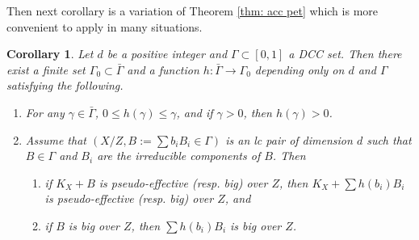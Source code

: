 \documentclass[11pt]{amsart}
\numberwithin{equation}{section}
\newcommand{\Ii}{{\Gamma}}
\newtheorem{cor}[thm]{Corollary}
\theoremstyle{definition}
\theoremstyle{definition}
\begin{document}
Then next corollary is a variation of Theorem \ref{thm: acc pet} which is more convenient to apply in many situations.
\begin{cor}\label{cor: gap of psd thresholds}
Let $d$ be a positive integer and $\Ii\subset [0,1]$ a DCC set. Then there exist a finite set $\Ii_0\subset\bar\Ii$ and a function $h: \bar\Ii\rightarrow\Ii_0$ depending only on $d$ and $\Ii$ satisfying the following. 
\begin{enumerate}
    \item For any $\gamma\in\bar\Ii$, $0\leq h(\gamma)\leq\gamma$, and if $\gamma>0$, then $h(\gamma)>0$. 
    \item Assume that $(X/Z,B:=\sum b_iB_i\in\Ii)$ is an lc pair of dimension $d$ such that $B\in\Ii$ and $B_i$ are the irreducible components of $B$. Then 
\begin{enumerate}
  \item if $K_X+B$ is pseudo-effective (resp. big) over $Z$,  then $K_X+\sum h(b_i)B_i$ is pseudo-effective (resp. big) over $Z$, and 
  \item if $B$ is big over $Z$, then $\sum h(b_i)B_i$ is big over $Z$.
\end{enumerate}
\end{enumerate}
\end{cor}
\end{document}
